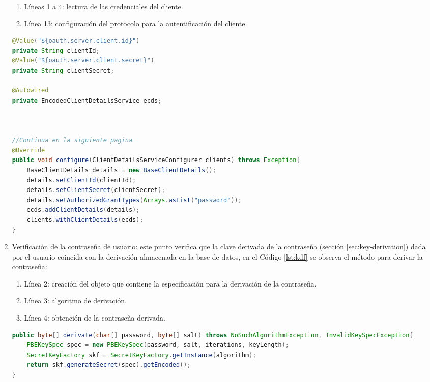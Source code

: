\begin{enumerate}
	\begin{enumerate}
		\item Líneas 1 a 4: lectura de las credenciales del cliente.
		\item Línea 13: configuración del protocolo para la autentificación del cliente. 
	\end{enumerate}

\begin{lstlisting}[language=Java, caption={Clase de autentificación de cliente.}, captionpos=b, label={lst:client-auth}]
@Value("${oauth.server.client.id}")
private String clientId;
@Value("${oauth.server.client.secret}")
private String clientSecret;

@Autowired
private EncodedClientDetailsService ecds;



//Continua en la siguiente pagina
@Override
public void configure(ClientDetailsServiceConfigurer clients) throws Exception{
	BaseClientDetails details = new BaseClientDetails();
	details.setClientId(clientId);
	details.setClientSecret(clientSecret);
	details.setAuthorizedGrantTypes(Arrays.asList("password"));
	ecds.addClientDetails(details);
	clients.withClientDetails(ecds);
}
\end{lstlisting}

	\item Verificación de la contraseña de usuario: este punto verifica que la clave derivada de la contraseña (sección \ref{sec:key-derivation}) dada por el usuario coincida con la derivación almacenada en la base de datos, en el Código \ref{lst:kdf} se observa el método para derivar la contraseña:
	\begin{enumerate}
		\item Línea 2: creación del objeto que contiene la especificación para la derivación de la contraseña.
		\item Línea 3: algoritmo de derivación.
		\item Línea 4: obtención de la contraseña derivada.
	\end{enumerate}
\begin{lstlisting}[language=Java, caption={Derivación de la constraseña de usuario.}, captionpos=b, label={lst:kdf}]
public byte[] derivate(char[] password, byte[] salt) throws NoSuchAlgorithmException, InvalidKeySpecException{
	PBEKeySpec spec = new PBEKeySpec(password, salt, iterations, keyLength);
	SecretKeyFactory skf = SecretKeyFactory.getInstance(algorithm);
	return skf.generateSecret(spec).getEncoded();
}
\end{lstlisting}



\end{enumerate}
